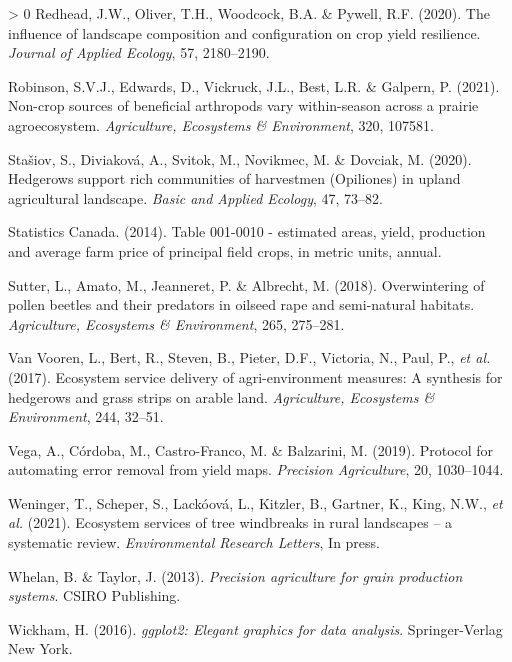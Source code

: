 \documentclass[]{elsarticle} %
\newlength{\cslhangindent}
\newenvironment{CSLReferences}[3] %
 {%
  \setlength{\parindent}{0pt}
  \ifodd #1 \everypar{\setlength{\hangindent}{\cslhangindent}}\ignorespaces\fi
  \ifnum #2 > 0
  \setlength{\parskip}{#2\baselineskip}
  \fi
 }%
 {}
\begin{document}
\begin{CSLReferences}{1}{0}
\leavevmode\hypertarget{ref-redhead2020}{}%
Redhead, J.W., Oliver, T.H., Woodcock, B.A. \& Pywell, R.F. (2020). The influence of landscape composition and configuration on crop yield resilience. \emph{Journal of Applied Ecology}, 57, 2180--2190.

\leavevmode\hypertarget{ref-robinson2021}{}%
Robinson, S.V.J., Edwards, D., Vickruck, J.L., Best, L.R. \& Galpern, P. (2021). Non-crop sources of beneficial arthropods vary within-season across a prairie agroecosystem. \emph{Agriculture, Ecosystems {\&} Environment}, 320, 107581.

\leavevmode\hypertarget{ref-stasiov2020}{}%
Stašiov, S., Diviaková, A., Svitok, M., Novikmec, M. \& Dovciak, M. (2020). Hedgerows support rich communities of harvestmen ({Opiliones}) in upland agricultural landscape. \emph{Basic and Applied Ecology}, 47, 73--82.

\leavevmode\hypertarget{ref-statscan_canola2014}{}%
Statistics Canada. (2014). Table 001-0010 - estimated areas, yield, production and average farm price of principal field crops, in metric units, annual.

\leavevmode\hypertarget{ref-sutter2018b}{}%
Sutter, L., Amato, M., Jeanneret, P. \& Albrecht, M. (2018). Overwintering of pollen beetles and their predators in oilseed rape and semi-natural habitats. \emph{Agriculture, Ecosystems {\&} Environment}, 265, 275--281.

\leavevmode\hypertarget{ref-vanVooren2017}{}%
Van Vooren, L., Bert, R., Steven, B., Pieter, D.F., Victoria, N., Paul, P., \emph{et al.} (2017). Ecosystem service delivery of agri-environment measures: A synthesis for hedgerows and grass strips on arable land. \emph{Agriculture, Ecosystems {\&} Environment}, 244, 32--51.

\leavevmode\hypertarget{ref-vega2019}{}%
Vega, A., Córdoba, M., Castro-Franco, M. \& Balzarini, M. (2019). Protocol for automating error removal from yield maps. \emph{Precision Agriculture}, 20, 1030--1044.

\leavevmode\hypertarget{ref-weninger2021}{}%
Weninger, T., Scheper, S., Lackóová, L., Kitzler, B., Gartner, K., King, N.W., \emph{et al.} (2021). Ecosystem services of tree windbreaks in rural landscapes -- a systematic review. \emph{Environmental Research Letters}, In press.

\leavevmode\hypertarget{ref-whelan2013}{}%
Whelan, B. \& Taylor, J. (2013). \emph{Precision agriculture for grain production systems}. CSIRO Publishing.

\leavevmode\hypertarget{ref-wickham2016}{}%
Wickham, H. (2016). \emph{{ggplot2}: Elegant graphics for data analysis}. Springer-Verlag New York.


\end{CSLReferences}
\end{document}
